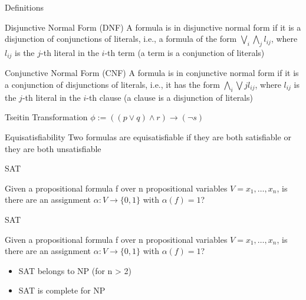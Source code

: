 \documentclass[mathserif]{beamer}
\begin{document}
\begin{frame}{Definitions}
\begin{block}{Disjunctive Normal Form (DNF)}
A formula is in disjunctive normal form if it is a disjunction of conjunctions of literals, i.e., a formula of the form $\bigvee\limits_{i}\bigwedge\limits_{j}l_{ij}$, where $l_{ij}$ is the $j$-th literal in the $i$-th term (a term is a conjunction of literals)
\end{block}
\begin{block}{Conjunctive Normal Form (CNF)}
A formula is in conjunctive normal form if it is a conjunction of disjunctions of literals, i.e., it has the form $\bigwedge\limits_{i}\bigvee\limits{j}l_{ij}$, where $l_{ij}$ is the $j$-th literal in the $i$-th clause (a clause is a disjunction of literals)
\end{block}
\end{frame}

\begin{frame}{Tseitin Transformation}
$\phi := ((p \vee q) \wedge r) \rightarrow (\lnot s)$
\begin{block}{Equisatisfiability}
Two formulas are equisatisfiable if they are both satisfiable or they are both unsatisfiable
\end{block}
\end{frame}

\begin{frame}{SAT}
\begin{block}{}
Given a propositional formula f over n propositional variables $V = {x_1, \dots, x_n}$, is there are an assignment $\alpha: V \rightarrow \{0, 1\}$ with $\alpha(f) = 1$?
\end{block}
\end{frame}

\begin{frame}{SAT}
\begin{block}{}
Given a propositional formula f over n propositional variables $V = {x_1, \dots, x_n}$, is there are an assignment $\alpha: V \rightarrow \{0, 1\}$ with $\alpha(f) = 1$?
\end{block}
\begin{itemize}
\item SAT belongs to NP (for n > 2)
\item SAT is complete for NP
\end{itemize}
\end{frame}
\end{document}
